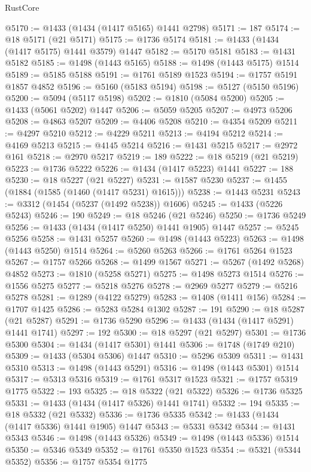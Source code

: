 \begin{lexlean}{RustCore}
\begin{coremodule}
@5170 := @1433 (@1434 (@1417 @5165) @1441 @2798)
@5171 := 187
@5174 := @18 @5171 (@21 @5171)
@5175 := @1736 @5174
@5181 := @1433 (@1434 (@1417 @5175) @1441 @3579) @1447
@5182 := @5170 @5181
@5183 := @1431 @5182
@5185 := @1498 (@1443 @5165)
@5188 := @1498 (@1443 @5175) @1514
@5189 := @5185 @5188
@5191 := @1761 @5189 @1523
@5194 := @1757 @5191 @1857 @4852
@5196 := @5160 (@5183 @5194)
@5198 := @5127 (@5150 @5196)
@5200 := @5094 (@5117 @5198)
@5202 := @1810 (@5084 @5200)
@5205 := @1433 (@5061 @5202) @1447
@5206 := @5059 @5205
@5207 := @4973 @5206
@5208 := @4863 @5207
@5209 := @4406 @5208
@5210 := @4354 @5209
@5211 := @4297 @5210
@5212 := @4229 @5211
@5213 := @4194 @5212
@5214 := @4169 @5213
@5215 := @4145 @5214
@5216 := @1431 @5215
@5217 := @2972 @161
@5218 := @2970 @5217
@5219 := 189
@5222 := @18 @5219 (@21 @5219)
@5223 := @1736 @5222
@5226 := @1434 (@1417 @5223) @1441
@5227 := 188
@5230 := @18 @5227 (@21 @5227)
@5231 := @1587 @5230
@5237 := @1455 (@1884 (@1585 (@1460 (@1417 @5231) @1615)))
@5238 := @1443 @5231
@5243 := @3312 (@1454 (@5237 (@1492 @5238)) @1606)
@5245 := @1433 (@5226 @5243)
@5246 := 190
@5249 := @18 @5246 (@21 @5246)
@5250 := @1736 @5249
@5256 := @1433 (@1434 (@1417 @5250) @1441 @1905) @1447
@5257 := @5245 @5256
@5258 := @1431 @5257
@5260 := @1498 (@1443 @5223)
@5263 := @1498 (@1443 @5250) @1514
@5264 := @5260 @5263
@5266 := @1761 @5264 @1523
@5267 := @1757 @5266
@5268 := @1499 @1567
@5271 := @5267 (@1492 @5268) @4852
@5273 := @1810 (@5258 @5271)
@5275 := @1498 @5273 @1514
@5276 := @1556 @5275
@5277 := @5218 @5276
@5278 := @2969 @5277
@5279 := @5216 @5278
@5281 := @1289 (@4122 @5279)
@5283 := @1408 (@1411 @156)
@5284 := @1707 @1425
@5286 := @5283 @5284 @1302
@5287 := 191
@5290 := @18 @5287 (@21 @5287)
@5291 := @1736 @5290
@5296 := @1433 (@1434 (@1417 @5291) @1441 @1741)
@5297 := 192
@5300 := @18 @5297 (@21 @5297)
@5301 := @1736 @5300
@5304 := @1434 (@1417 @5301) @1441
@5306 := @1748 (@1749 @210)
@5309 := @1433 (@5304 @5306) @1447
@5310 := @5296 @5309
@5311 := @1431 @5310
@5313 := @1498 (@1443 @5291)
@5316 := @1498 (@1443 @5301) @1514
@5317 := @5313 @5316
@5319 := @1761 @5317 @1523
@5321 := @1757 @5319 @1775
@5322 := 193
@5325 := @18 @5322 (@21 @5322)
@5326 := @1736 @5325
@5331 := @1433 (@1434 (@1417 @5326) @1441 @1741)
@5332 := 194
@5335 := @18 @5332 (@21 @5332)
@5336 := @1736 @5335
@5342 := @1433 (@1434 (@1417 @5336) @1441 @1905) @1447
@5343 := @5331 @5342
@5344 := @1431 @5343
@5346 := @1498 (@1443 @5326)
@5349 := @1498 (@1443 @5336) @1514
@5350 := @5346 @5349
@5352 := @1761 @5350 @1523
@5354 := @5321 (@5344 @5352)
@5356 := @1757 @5354 @1775

\end{coremodule}
\end{lexlean}
